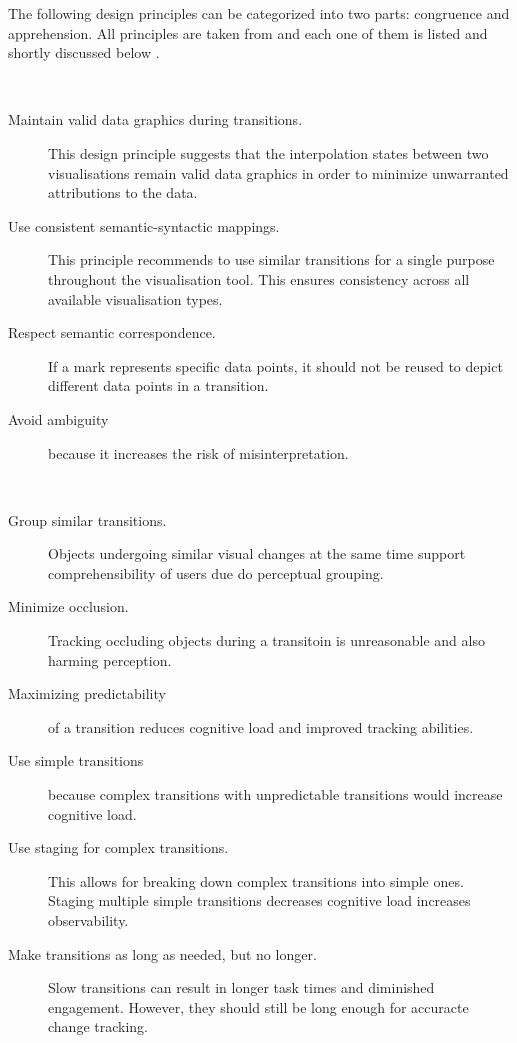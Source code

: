 The following design principles can be categorized into two parts: congruence and apprehension. All principles are taken from \citeauthor{Heer2007} and each one of them is listed and shortly discussed below .
\begin{enumerate}
 \hfill \\
\begin{description}
\item[Maintain valid data graphics during transitions.] This design principle suggests that the interpolation states between two visualisations remain valid data graphics in order to minimize unwarranted attributions to the data.
\item[Use consistent semantic-syntactic mappings.] This principle recommends to use similar transitions for a single purpose throughout the visualisation tool. This ensures consistency across all available visualisation types.
\item[Respect semantic correspondence.] If a mark represents specific data points, it should not be reused to depict different data points in a transition.
\item[Avoid ambiguity] because it increases the risk of misinterpretation.
\end{description}

 \hfill \\
\begin{description}
\item[Group similar transitions.] Objects undergoing similar visual changes at the same time support comprehensibility of users due do perceptual grouping.
\item[Minimize occlusion.] Tracking occluding objects during a transitoin is unreasonable and also harming perception.
\item[Maximizing predictability] of a transition reduces cognitive load and improved tracking abilities.
\item[Use simple transitions] because complex transitions with unpredictable transitions would increase cognitive load.
\item[Use staging for complex transitions.] This allows for breaking down complex transitions into simple ones. Staging multiple simple transitions decreases cognitive load increases observability.
\item[Make transitions as long as needed, but no longer.] Slow transitions can result in longer task times and diminished engagement. However, they should still be long enough for accuracte change tracking.
\end{description}

\end{enumerate}


